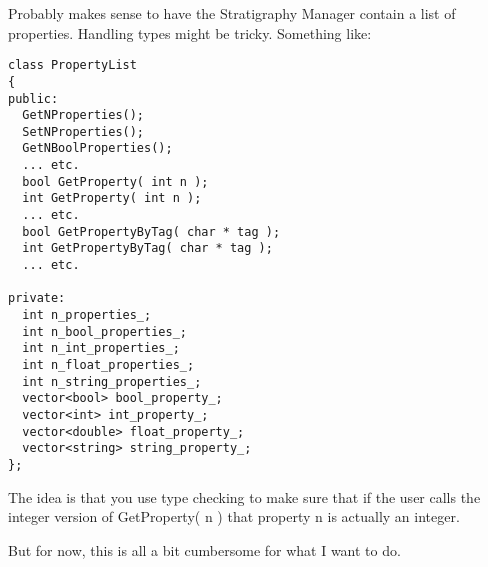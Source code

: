 \documentclass[12pt]{amsart}
\begin{document}
\begin{enumerate}
Probably makes sense to have the Stratigraphy Manager contain a list of properties. Handling types might be tricky. Something like:
\begin{verbatim}
class PropertyList
{
public:
  GetNProperties();
  SetNProperties();
  GetNBoolProperties();
  ... etc.
  bool GetProperty( int n );
  int GetProperty( int n );
  ... etc.
  bool GetPropertyByTag( char * tag );
  int GetPropertyByTag( char * tag );
  ... etc.

private:
  int n_properties_;
  int n_bool_properties_;
  int n_int_properties_;
  int n_float_properties_;
  int n_string_properties_;
  vector<bool> bool_property_;
  vector<int> int_property_;
  vector<double> float_property_;
  vector<string> string_property_;
};
\end{verbatim}
The idea is that you use type checking to make sure that if the user calls the integer version of GetProperty( n ) that property n is actually an integer.

But for now, this is all a bit cumbersome for what I want to do.

  
\end{enumerate}
\end{document}
